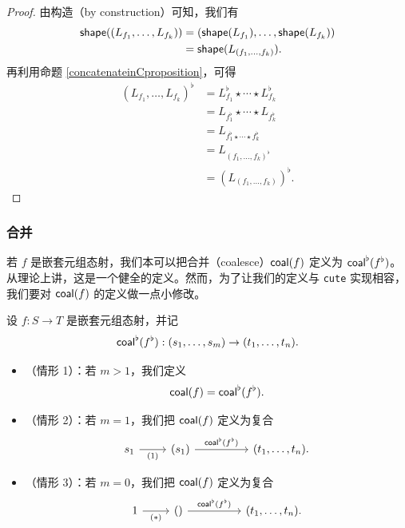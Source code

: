 \begin{proof}
由构造（by construction）可知，我们有
\begin{align*}
 \mathsf{shape}((L_{f_1},\dots,L_{f_k})) & = (\mathsf{shape}(L_{f_1}),\dots,\mathsf{shape}(L_{f_k}))\\
& = \mathsf{shape}(L_{(f_1,\dots,f_k)}).
\end{align*}
再利用命题 \ref{concatenateinCproposition}，可得
\begin{align*}
(L_{f_1},\dots,L_{f_k})^\flat & = L_{f_1}^\flat \star \cdots \star L_{f_k}^\flat\\
& = L_{f_1^\flat} \star \cdots \star L_{f_k^\flat} \\
& = L_{f_1^\flat \star \cdots \star f_k^\flat }\\
& = L_{(f_1,\dots, f_k)^\flat}\\
& = (L_{(f_1,\dots,f_k)})^\flat.
\end{align*}
\end{proof}


\subsubsection{合并}

若 $f$ 是嵌套元组态射，我们本可以把合并（coalesce）$\mathsf{coal}(f)$ 定义为 $\mathsf{coal}^\flat(f^\flat)$。从理论上讲，这是一个健全的定义。然而，为了让我们的定义与 \texttt{cute} 实现相容，我们要对 $\mathsf{coal}(f)$ 的定义做一点小修改。

\begin{definition}
\label{definitionofcoalesceofnestedtuplemorphism}
    设 $f:S \to T$ 是嵌套元组态射，并记
    \[
    \mathsf{coal}^\flat(f^\flat):(s_1,\dots,s_m) \to (t_1,\dots,t_n).
    \]
    \begin{itemize}
    \item （情形 1）：若 $m >1$，我们定义
    \[\mathsf{coal}(f) = \mathsf{coal}^\flat(f^\flat).\]
    \item （情形 2）：若 $m = 1$，我们把 $\mathsf{coal}(f)$ 定义为复合
    \[
    \begin{tikzcd}
    s_1 \ar[r,swap,"(1)"] &  (s_1) \ar[rr,"\coalesce^\flat(f^\flat)"] & & (t_1,\dots,t_n).
    \end{tikzcd}
    \]
    \item （情形 3）：若 $m = 0$，我们把 $\mathsf{coal}(f)$ 定义为复合
    \[
    \begin{tikzcd}
    1 \ar[r,swap,"(*)"] &  () \ar[rr,"\coalesce^\flat(f^\flat)"] & & (t_1,\dots,t_n).
    \end{tikzcd}
    \]
    \end{itemize}
\end{definition}

